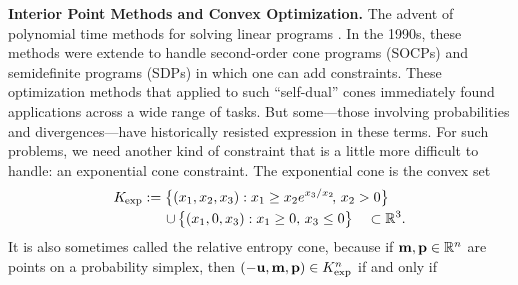 \documentclass[twoside]{article}
\begin{document}
% 
\textbf{Interior Point Methods and Convex Optimization.}
The advent of polynomial time methods for solving linear programs
\parencite{}.
In the 1990s, these methods were extende to handle second-order cone programs (SOCPs) and semidefinite programs (SDPs) in which one can add constraints.
These optimization methods that applied to such ``self-dual'' cones
    immediately found applications across a wide range of tasks. 
But some---those involving probabilities and divergences---have historically
resisted expression in these terms. For such problems, we need another kind of constraint
that is a little more difficult to handle: an exponential cone constraint. 
%
%
The exponential cone is the convex set
\begin{align*}
        \begin{aligned}
        K_{\mskip-1mu\exp} :=
        \big\{ (x_1, x_2, x_3) &: 
                x_1 \ge x_2 e^{x_3 / x_2}\!,\, x_2 > 0 \big\} 
            \\[-0.2ex]\quad \mathbin{\cup}\, 
        \big\{ (x_1, 0, x_3&) : x_1 \ge 0,\, x_3 \le 0 \big\} 
        \quad \subset \mathbb R^3.
    \end{aligned}
\end{align*}
It is also sometimes called the relative entropy cone, because
if $\mathbf{m}, \mathbf{p} \in \mathbb R^n$ are points on a probability simplex,
then $(-\mathbf{u}, \mathbf{m}, \mathbf{p}) \in K_{\exp}^n$ if and only if
\end{document}
